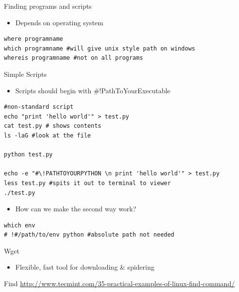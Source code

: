 \documentclass[presentation]{beamer}
\begin{document}
\begin{frame}[fragile,label=sec-3-0-6]{Finding programs and scripts}
 \begin{itemize}
\item Depends on operating system
\end{itemize}

\lstset{numbers=left,language=sh,label= ,caption= }
\begin{lstlisting}
where programname
which programname #will give unix style path on windows
whereis programname #not on all programs
\end{lstlisting}
\end{frame}



\begin{frame}[fragile,label=sec-3-0-7]{Simple Scripts}
 \begin{itemize}
\item Scripts should begin with \#!PathToYourExecutable
\end{itemize}
\lstset{numbers=left,language=sh,label= ,caption= }
\begin{lstlisting}
#non-standard script
echo "print 'hello world'" > test.py
cat test.py # shows contents
ls -laG #look at the file 

python test.py 

echo -e "#\!PATHTOYOURPYTHON \n print 'hello world'" > test.py
less test.py #spits it out to terminal to viewer
./test.py
\end{lstlisting}
\begin{itemize}
\item How can we make the second way work?
\end{itemize}

\lstset{numbers=left,language=sh,label= ,caption= }
\begin{lstlisting}
which env 
# !#/path/to/env python #absolute path not needed
\end{lstlisting}

\end{frame}



\begin{frame}[label=sec-3-0-8]{Wget}
\begin{itemize}
\item Flexible, fast tool for downloading \& spidering
\end{itemize}
\end{frame}

\begin{frame}[label=sec-3-0-9]{Find}
\url{http://www.tecmint.com/35-practical-examples-of-linux-find-command/}
\end{frame}
\end{document}
